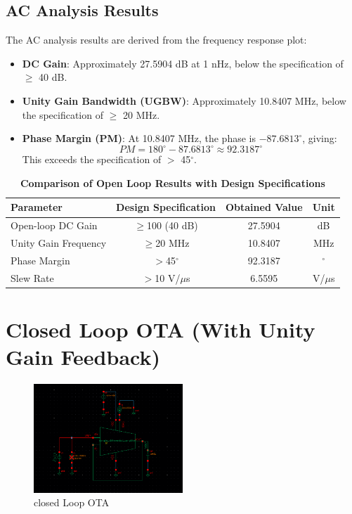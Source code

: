 \subsection{AC Analysis Results}
The AC analysis results are derived from the frequency response plot:

\begin{itemize}
    \item \textbf{DC Gain}: Approximately 27.5904 dB at 1 nHz, below the specification of $\geq$ 40 dB.
    \item \textbf{Unity Gain Bandwidth (UGBW)}: Approximately 10.8407 MHz, below the specification of $\geq$ 20 MHz.
    \item \textbf{Phase Margin (PM)}: At 10.8407 MHz, the phase is $-87.6813^\circ$, giving:
    \begin{equation}
        PM = 180^\circ - 87.6813^\circ \approx 92.3187^\circ
    \end{equation}
    This exceeds the specification of $>$ 45$^\circ$.
\end{itemize}

\begin{table}[h]
    \centering
    \captionsetup{justification=centering} %
    \caption*{\textbf{Comparison of Open Loop Results with Design Specifications}} %
    \begin{tabular}{l c c c}
        \toprule
        \textbf{Parameter} & \textbf{Design Specification} & \textbf{Obtained Value} & \textbf{Unit} \\
        \midrule
        Open-loop DC Gain & $\geq$100 (40 dB) & 27.5904 & dB \\
        Unity Gain Frequency & $\geq$20 MHz & 10.8407 & MHz \\
        Phase Margin & $>$45$^\circ$ & 92.3187 & $^\circ$ \\
        Slew Rate & $>$10 V/$\mu$s & 6.5595 & V/$\mu$s \\
        \bottomrule
    \end{tabular}
\end{table}


\section{Closed Loop OTA (With Unity Gain Feedback)}
    \begin{figure}[h]
        \centering
           \includegraphics[width=0.5\textwidth]{images/single_ota_close.png}
        \caption{closed Loop OTA}
        \label{fig: }
    \end{figure}
    
